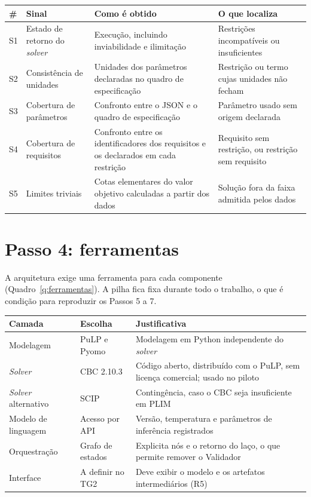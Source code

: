 \begin{quadro}[htbp]
\caption{Sinais externos do Validador}
\label{q:sinais}
\centering
\small
\begin{tabularx}{\textwidth}{@{}l X X X@{}}
\toprule
\# & Sinal & Como é obtido & O que localiza \\
\midrule
S1 & Estado de retorno do \textit{solver} & Execução, incluindo inviabilidade e ilimitação & Restrições incompatíveis ou insuficientes \\
S2 & Consistência de unidades & Unidades dos parâmetros declaradas no quadro de especificação & Restrição ou termo cujas unidades não fecham \\
S3 & Cobertura de parâmetros & Confronto entre o JSON e o quadro de especificação & Parâmetro usado sem origem declarada \\
S4 & Cobertura de requisitos & Confronto entre os identificadores dos requisitos e os declarados em cada restrição & Requisito sem restrição, ou restrição sem requisito \\
S5 & Limites triviais & Cotas elementares do valor objetivo calculadas a partir dos dados & Solução fora da faixa admitida pelos dados \\
\bottomrule
\end{tabularx}
\end{quadro}

\section{Passo 4: ferramentas}
\label{sec:ferramentas}

A arquitetura exige uma ferramenta para cada componente (Quadro~\ref{q:ferramentas}). A pilha fica fixa durante todo o trabalho, o que é condição para reproduzir os Passos 5 a 7.

\begin{quadro}[htbp]
\caption{Ferramentas selecionadas}
\label{q:ferramentas}
\centering
\small
\begin{tabularx}{\textwidth}{@{}l l X@{}}
\toprule
Camada & Escolha & Justificativa \\
\midrule
Modelagem & PuLP e Pyomo & Modelagem em Python independente do \textit{solver} \cite{mitchell2011, hart2011} \\
\textit{Solver} & CBC 2.10.3 \cite{forrest2019} & Código aberto, distribuído com o PuLP, sem licença comercial; usado no piloto \\
\textit{Solver} alternativo & SCIP \cite{achterberg2009} & Contingência, caso o CBC seja insuficiente em PLIM \\
Modelo de linguagem & Acesso por API & Versão, temperatura e parâmetros de inferência registrados \\
Orquestração & Grafo de estados & Explicita nós e o retorno do laço, o que permite remover o Validador \\
Interface & A definir no TG2 & Deve exibir o modelo e os artefatos intermediários (R5) \\
\bottomrule
\end{tabularx}
\end{quadro}


